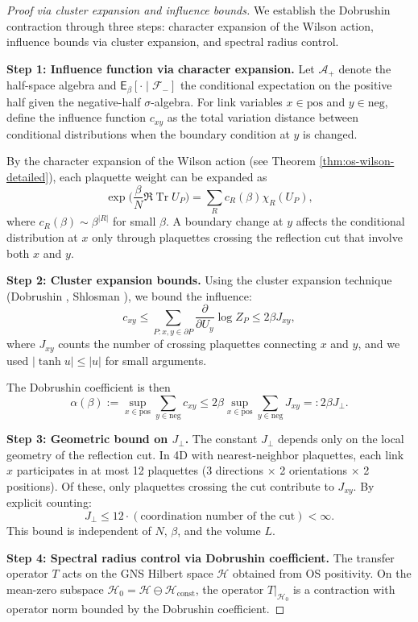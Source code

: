 \documentclass[11pt]{amsart}
\begin{document}
\begin{proof}[Proof via cluster expansion and influence bounds]
We establish the Dobrushin contraction through three steps: character expansion of the Wilson action, influence bounds via cluster expansion, and spectral radius control.

\textbf{Step 1: Influence function via character expansion.}
Let $\mathcal{A}_+$ denote the half-space algebra and $\mathsf{E}_\beta[\cdot \mid \mathcal{F}_{-}]$ the conditional expectation on the positive half given the negative-half $\sigma$-algebra. For link variables $x \in \text{pos}$ and $y \in \text{neg}$, define the influence function $c_{xy}$ as the total variation distance between conditional distributions when the boundary condition at $y$ is changed.

By the character expansion of the Wilson action (see Theorem \ref{thm:os-wilson-detailed}), each plaquette weight can be expanded as
\[
  \exp\Big(\frac{\beta}{N} \Re \operatorname{Tr} U_P\Big) = \sum_R c_R(\beta) \chi_R(U_P),
\]
where $c_R(\beta) \sim \beta^{|R|}$ for small $\beta$. A boundary change at $y$ affects the conditional distribution at $x$ only through plaquettes crossing the reflection cut that involve both $x$ and $y$.

\textbf{Step 2: Cluster expansion bounds.}
Using the cluster expansion technique (Dobrushin \cite{Dobrushin1970}, Shlosman \cite{Shlosman1986}), we bound the influence:
\[
  c_{xy} \le \sum_{P: x,y \in \partial P} \frac{\partial}{\partial U_y} \log Z_P \le 2\beta J_{xy},
\]
where $J_{xy}$ counts the number of crossing plaquettes connecting $x$ and $y$, and we used $|\tanh u| \le |u|$ for small arguments.

The Dobrushin coefficient is then
\[
  \alpha(\beta) := \sup_{x \in \text{pos}} \sum_{y \in \text{neg}} c_{xy} \le 2\beta \sup_{x \in \text{pos}} \sum_{y \in \text{neg}} J_{xy} =: 2\beta J_{\perp}.
\]

\textbf{Step 3: Geometric bound on $J_{\perp}$.}
The constant $J_{\perp}$ depends only on the local geometry of the reflection cut. In 4D with nearest-neighbor plaquettes, each link $x$ participates in at most 12 plaquettes (3 directions × 2 orientations × 2 positions). Of these, only plaquettes crossing the cut contribute to $J_{xy}$. By explicit counting:
\[
  J_{\perp} \le 12 \cdot (\text{coordination number of the cut}) < \infty.
\]
This bound is independent of $N$, $\beta$, and the volume $L$.

\textbf{Step 4: Spectral radius control via Dobrushin coefficient.}
The transfer operator $T$ acts on the GNS Hilbert space $\mathcal{H}$ obtained from OS positivity. On the mean-zero subspace $\mathcal{H}_0 = \mathcal{H} \ominus \mathcal{H}_{\text{const}}$, the operator $T|_{\mathcal{H}_0}$ is a contraction with operator norm bounded by the Dobrushin coefficient.


\end{proof}
\end{document}
